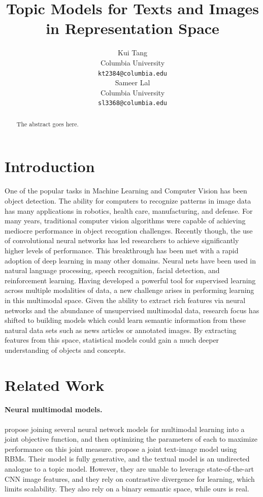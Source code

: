 \documentclass[11pt]{article}
\title{Topic Models for Texts and Images in Representation Space}
\author{Kui Tang \\
  Columbia University \\
  {\tt kt2384@columbia.edu} \\\And
  Sameer Lal \\
  Columbia University \\
  {\tt sl3368@columbia.edu} \\}
\date{}
\begin{document}
\maketitle
\begin{abstract}
The abstract goes here.
\end{abstract}

\section{Introduction}
One of the popular tasks in Machine Learning and Computer Vision has been object detection. The ability for computers to recognize patterns in image data has many applications in robotics, health care, manufacturing, and defense. For many years, traditional computer vision algorithms were capable of achieving mediocre performance in object recogntion challenges. Recently though, the use of convolutional neural networks has led researchers to achieve significantly higher levels of performance. This breakthrough has been met with a rapid adoption of deep learning in many other domains. Neural nets have been used in natural language processing, speech recognition, facial detection, and reinforcement learning. Having developed a powerful tool for supervised learning across multiple modalities of data, a new challenge arises in performing learning in this multimodal space. Given the ability to extract rich features via neural networks and the abundance of unsupervised multimodal data, research focus has shifted to building models which could learn semantic information from these natural data sets such as news articles or annotated images. By extracting features from this space, statistical models could gain a much deeper understanding of objects and concepts. 

\section{Related Work}
\paragraph{Neural multimodal models.}
\cite{Lecun98} propose joining several neural network models for multimodal learning into a joint objective function, and then optimizing the parameters of each to maximize performance on this joint measure. \cite{Srivastava14} propose a joint text-image model using RBMs. Their model is fully generative, and the textual model is an undirected analogue to a topic model. However, they are unable to leverage state-of-the-art CNN image features, and they rely on contrastive divergence for learning, which limits scalability. They also rely on a binary semantic space, while ours is real.
\end{document}
